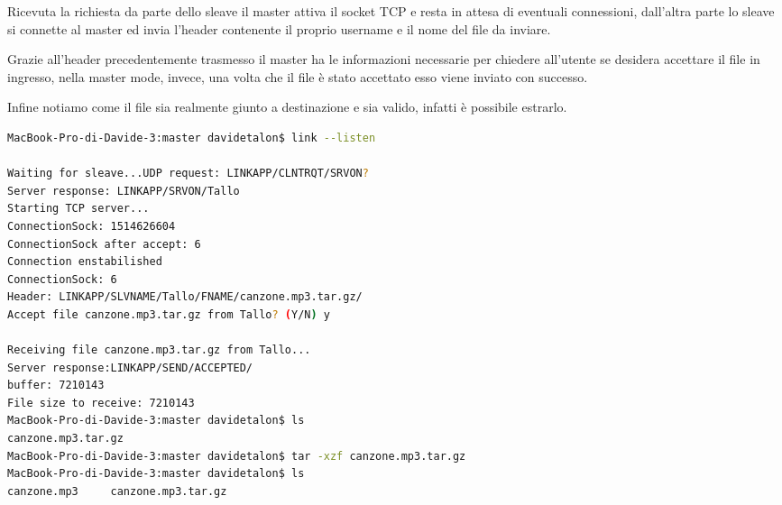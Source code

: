 \documentclass[11pt,fleqn]{book} %
\begin{document}
Ricevuta la richiesta da parte dello sleave il master attiva il socket TCP e resta in attesa di eventuali connessioni, dall'altra parte lo sleave si connette al master ed invia l'header contenente il proprio username e il nome del file da inviare.

\begin{Parallel}{0.5\textwidth}{0.5\textwidth}
\ParallelPar
\end{Parallel}

Grazie all'header precedentemente trasmesso il master ha le informazioni necessarie per chiedere all'utente se desidera accettare il file in ingresso, nella master mode, invece, una volta che il file è stato accettato esso viene inviato con successo.

\noindent Infine notiamo come il file sia realmente giunto a destinazione e sia valido, infatti è possibile estrarlo.

\begin{lstlisting}[language=Bash]
MacBook-Pro-di-Davide-3:master davidetalon$ link --listen

Waiting for sleave...UDP request: LINKAPP/CLNTRQT/SRVON?
Server response: LINKAPP/SRVON/Tallo
Starting TCP server...
ConnectionSock: 1514626604
ConnectionSock after accept: 6
Connection enstabilished
ConnectionSock: 6
Header: LINKAPP/SLVNAME/Tallo/FNAME/canzone.mp3.tar.gz/
Accept file canzone.mp3.tar.gz from Tallo? (Y/N) y

Receiving file canzone.mp3.tar.gz from Tallo...
Server response:LINKAPP/SEND/ACCEPTED/
buffer: 7210143
File size to receive: 7210143
MacBook-Pro-di-Davide-3:master davidetalon$ ls
canzone.mp3.tar.gz
MacBook-Pro-di-Davide-3:master davidetalon$ tar -xzf canzone.mp3.tar.gz
MacBook-Pro-di-Davide-3:master davidetalon$ ls
canzone.mp3		canzone.mp3.tar.gz
\end{lstlisting}
\end{document}
